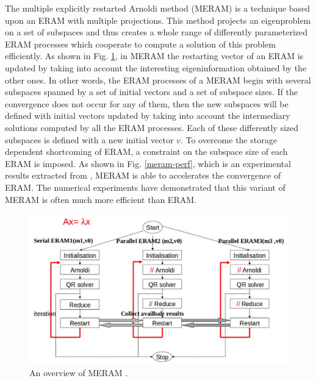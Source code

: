 The multiple explicitly restarted Arnoldi method (MERAM) is a technique based upon an ERAM with multiple projections. This method projects an eigenproblem on a set of subspaces and thus creates a whole range of differently parameterized ERAM processes which cooperate to compute a solution of this problem efficiently. As shown in Fig. \ref{meram}, in MERAM the restarting vector of an ERAM is updated by taking into account the interesting eigeninformation obtained by the other ones. In other words, the ERAM processes of a MERAM begin with several subspaces spanned by a set of initial vectors and a set of subspace sizes. If the convergence does not occur for any of them, then the new subspaces will be defined with initial vectors updated by taking into account the intermediary solutions computed by all the ERAM processes. Each of these differently sized subspaces is defined with a new initial vector $v$. To overcome the storage dependent shortcoming of ERAM, a constraint on the subspace size of each ERAM is imposed. As shown in Fig. \ref{meram-perf}, which is an experimental results extracted from \cite{emad2005multiple}, MERAM is able to accelerates the convergence of ERAM. The numerical experiments have demonstrated that this variant of MERAM is often much more efficient than ERAM. 

\begin{figure}[htbp]
	\centering
	\includegraphics[width=6.3in]{fig/meram.png}
	\caption{An overview of MERAM \cite{emad2005multiple}.}
	\label{meram}
\end{figure}

